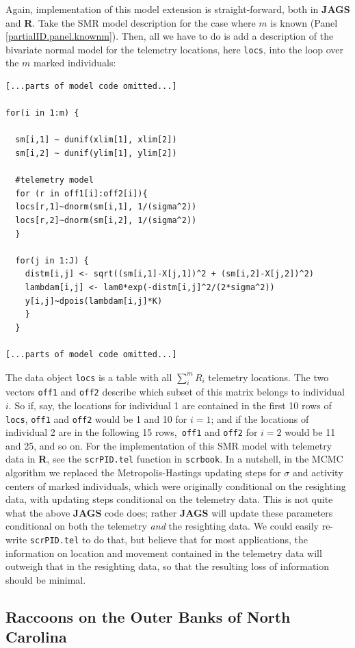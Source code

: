 Again, implementation of this model extension is straight-forward,
both in {\bf JAGS} and {\bf R}. Take the SMR model description for the
case where $m$ is known (Panel \ref{partialID.panel.knownm}). Then,
all we have to do is add a description of the bivariate normal model
for the telemetry locations, here {\tt locs}, into the loop over the
$m$ marked individuals:
{\small
\begin{verbatim}
[...parts of model code omitted...]

for(i in 1:m) {

  sm[i,1] ~ dunif(xlim[1], xlim[2])
  sm[i,2] ~ dunif(ylim[1], ylim[2])

  #telemetry model
  for (r in off1[i]:off2[i]){
  locs[r,1]~dnorm(sm[i,1], 1/(sigma^2))
  locs[r,2]~dnorm(sm[i,2], 1/(sigma^2))
  }

  for(j in 1:J) {
    distm[i,j] <- sqrt((sm[i,1]-X[j,1])^2 + (sm[i,2]-X[j,2])^2)
    lambdam[i,j] <- lam0*exp(-distm[i,j]^2/(2*sigma^2))
    y[i,j]~dpois(lambdam[i,j]*K)
    }
  }

[...parts of model code omitted...]
\end{verbatim}
}
The data object {\tt locs} is a table with all $\sum_i^m R_i$
telemetry locations. The two vectors {\tt off1} and {\tt off2}
describe which subset of this matrix belongs to individual $i$. So if,
say, the locations for individual 1 are contained in the first 10 rows
of {\tt locs}, {\tt off1} and {\tt off2} would be 1 and 10 for $i=1$;
and if the locations of individual 2 are in the following 15 rows,{\tt
  off1} and {\tt off2} for $i=2$ would be 11 and 25, and so on. For
the implementation of this SMR model with telemetry data in {\bf R},
see the {\tt scrPID.tel} function in {\tt scrbook}. In a nutshell, in
the MCMC algorithm we replaced the Metropolis-Hastings updating steps
for $\sigma$ and activity centers of marked individuals, which were originally
conditional on the resighting data, with updating steps conditional on
the telemetry data. This is not quite what the above {\bf JAGS} code
does; rather {\bf JAGS} will update these parameters conditional on
both the telemetry \emph{and} the resighting data. We could easily
re-write {\tt scrPID.tel} to do that, but believe that for most
applications, the information on location and movement contained in
the telemetry data will outweigh that in the resighting data, so that
the resulting loss of information should be minimal.

\subsection{Raccoons on the Outer Banks of North Carolina}

